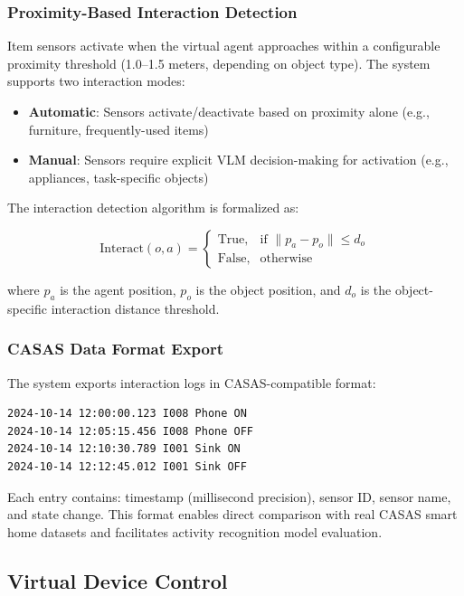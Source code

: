 \documentclass[conference]{IEEEtran}
\begin{document}
\subsubsection{Proximity-Based Interaction Detection}

Item sensors activate when the virtual agent approaches within a configurable proximity threshold (1.0--1.5 meters, depending on object type). The system supports two interaction modes:

\begin{itemize}
    \item \textbf{Automatic}: Sensors activate/deactivate based on proximity alone (e.g., furniture, frequently-used items)
    \item \textbf{Manual}: Sensors require explicit VLM decision-making for activation (e.g., appliances, task-specific objects)
\end{itemize}

The interaction detection algorithm is formalized as:

\begin{equation}
    \text{Interact}(o, a) = \begin{cases}
        \text{True}, & \text{if } \|p_a - p_o\| \leq d_o \\
        \text{False}, & \text{otherwise}
    \end{cases}
\end{equation}

where $p_a$ is the agent position, $p_o$ is the object position, and $d_o$ is the object-specific interaction distance threshold.

\subsubsection{CASAS Data Format Export}

The system exports interaction logs in CASAS-compatible format:

\begin{lstlisting}
2024-10-14 12:00:00.123 I008 Phone ON
2024-10-14 12:05:15.456 I008 Phone OFF
2024-10-14 12:10:30.789 I001 Sink ON
2024-10-14 12:12:45.012 I001 Sink OFF
\end{lstlisting}

Each entry contains: timestamp (millisecond precision), sensor ID, sensor name, and state change. This format enables direct comparison with real CASAS smart home datasets and facilitates activity recognition model evaluation.

\subsection{Virtual Device Control}
\end{document}
